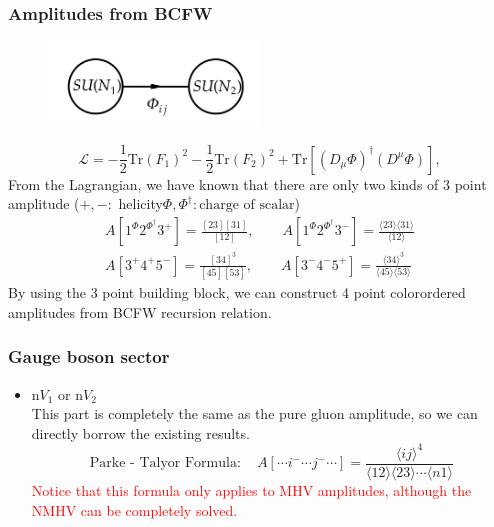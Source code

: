 \documentclass{beamer}
\newcommand{\avg}[1]{\langle #1 \rangle}
\begin{document}
\begin{frame}
    \frametitle{Amplitudes from BCFW}
    \begin{figure}
        \centering
        \includegraphics[width=0.5\textwidth]{2-site.png}
    \end{figure}
    \vspace{-1em}
    \begin{equation*}
        \mathcal{L}=-\frac{1}{2}\mathrm{Tr}(F_1)^2-\frac{1}{2}\mathrm{Tr}(F_2)^2+\mathrm{Tr}[(D_\mu\Phi)^\dagger(D^\mu\Phi)],
    \end{equation*}
    From the Lagrangian, we have known that there are only two kinds of 3 point amplitude ($+,-:$ helicity\qquad $\Phi,\Phi^\dagger: \text{charge of scalar}$)
    \begin{gather*}
        A[1^\Phi2^{\Phi^\dagger}3^+]=\frac{[23][31]}{[12]},\qquad A[1^\Phi2^{\Phi^\dagger}3^-]=\frac{\avg{23}\!\avg{31}}{\avg{12}}\\
        A[3^+4^+5^-]=\frac{[34]^3}{[45][53]},\qquad A[3^-4^-5^+]=\frac{\avg{34}^3}{\avg{45}\!\avg{53}}
    \end{gather*}
    By using the 3 point building block, we can construct 4 point colorordered amplitudes from BCFW recursion relation.
\end{frame}
\begin{frame}
    \frametitle{Gauge boson sector}
    \begin{itemize}
        \item n$ V_1$ or n$V_2$\\
        This part is completely the same as the pure gluon amplitude, so we can directly borrow the
        existing results.
        \begin{equation*}
            \boxed{\text{Parke - Talyor Formula}:\quad A[\cdots i^-\cdots j^-\cdots]=\frac{\avg{ij}^4}{\avg{12}\!\avg{23}\cdots\avg{n1}}}
        \end{equation*}
        \textcolor{red}{Notice that this formula only applies to MHV amplitudes, although the NMHV can be completely solved.}
    \end{itemize}
\end{frame}
\end{document}
